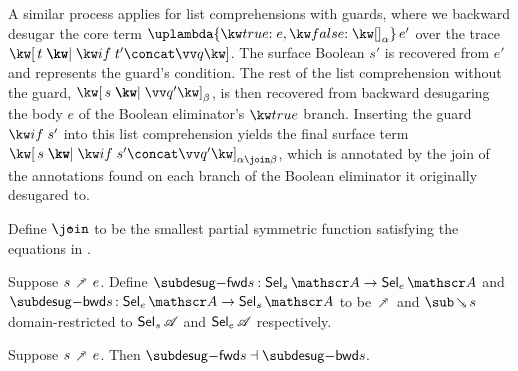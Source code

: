 A similar process applies for list comprehensions with guards, where we backward desugar the core term $\exApp{\exLambda{\elimBool{e}{\annNil{\alpha}}}}{e'}$ over the trace $\exListComp{t}{\qualGuard{t'} \concat \vec{q}}$. The surface Boolean $s'$ is recovered from $e'$ and represents the guard's condition. The rest of the list comprehension without the guard, $\annListComp{s}{\vec{q}'}{\beta}$, is then recovered from backward desugaring the body $e$ of the Boolean eliminator's $\exTrue$ branch. Inserting the guard $\qualGuard{s'}$ into this list comprehension yields the final surface term $\annListComp{s}{\qualGuard{s'} \concat \vec{q}'}{\alpha \join \beta}$, which is annotated by the join of the annotations found on each branch of the Boolean eliminator it originally desugared to.






\begin{definition}
   Define $\disjjoin$ to be the smallest partial symmetric function satisfying the equations in .
\end{definition}

\begin{definition}
     Suppose $s \desugarFwdR e$. Define $\desugarFwdF{s}: \Below{s} \to \Below{e}$ and $\desugarBwdF{s}: \Below{e} \to \Below{s}$ to be $\desugarFwdR$ and $\desugarBwdR{s}$ domain-restricted to $\textup{\textsf{Sel}}_{s}\,{\mathscr{A}}$ and $\textup{\textsf{Sel}}_{e}\,{\mathscr{A}}$ respectively.
\end{definition}

\begin{theorem}
  \label{thm:surface-language:desugar:gc}
     Suppose $s \desugarFwdR e$. Then $\desugarFwdF{s} \adjoint \desugarBwdF{s}$.
\end{theorem}

